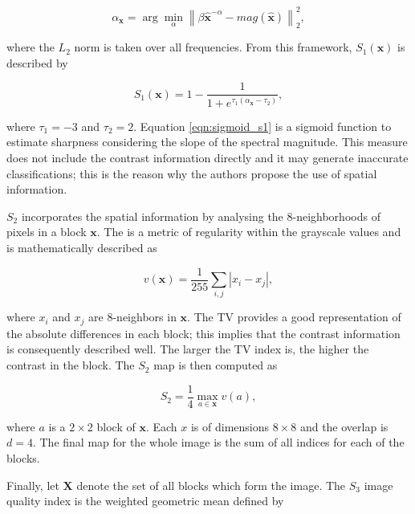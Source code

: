 \begin{equation}
\label{eqn:slope_of_magnitude}
\alpha_{\mathbf{x}} = \arg \min_{\alpha} \left\lVert \beta \hat{\mathbf{x}}^{-\alpha} -  mag(\hat{\mathbf{x}}) \right\rVert^{2}_{2},
\end{equation}

\noindent where the $L_{2}$ norm is taken over all frequencies. From this framework, $S_{1}(\mathbf{x})$ is described by

\begin{equation}
\label{eqn:sigmoid_s1}
S_{1}(\mathbf{x}) = 1 - \frac{1}{1 + e^{\tau_{1}
(\alpha_{\mathbf{x}} - \tau_{2})}},
\end{equation}

\noindent where $\tau_{1} = -3$ and $\tau_{2} = 2$. Equation \ref{eqn:sigmoid_s1} is a sigmoid function to estimate sharpness considering the slope of the spectral magnitude. This measure does not include the contrast information directly and it may generate inaccurate classifications; this is the reason why the authors propose the use of spatial information.

$S_{2}$ incorporates the spatial information by analysing the 8-neighborhoods of pixels in a block $\mathbf{x}$. The  is a metric of regularity within the grayscale values and is mathematically described as

\begin{equation}
\label{eqn:total_variation}
v(\mathbf{x}) = \frac{1}{255}\sum_{i,j}\left|x_{i} - x_{j}\right|,
\end{equation}

\noindent where $x_{i}$ and $x_{j}$ are 8-neighbors in $\mathbf{x}$. The TV provides a good representation of the absolute differences in each block; this implies that the contrast information is consequently described well. The larger the TV index is, the higher the contrast in the block. The $S_{2}$ map is then computed as

\begin{equation}
\label{eqn:spatial_s2}
S_{2} = \frac{1}{4} \max_{a \in \mathbf{x}} v(a),
\end{equation}

\noindent where $a$ is a $2 \times 2$ block of $\mathbf{x}$. Each $x$ is of dimensions $8 \times 8$ and the overlap is $d = 4$. The final map for the whole image is the sum of all indices for each of the blocks.

Finally, let $\mathbf{X}$ denote the set of all blocks which form the image. The $S_{3}$ image quality index is the weighted geometric mean defined by

